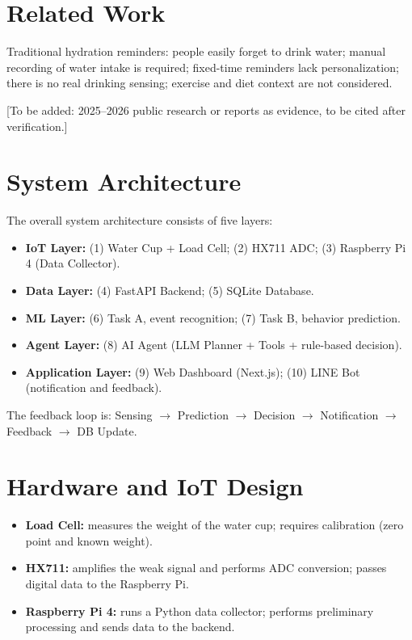 \documentclass[conference]{IEEEtran}
\begin{document}
\section{Related Work}

Traditional hydration reminders: people easily forget to drink water; manual recording of water intake is required; fixed-time reminders lack personalization; there is no real drinking sensing; exercise and diet context are not considered.

[To be added: 2025--2026 public research or reports as evidence, to be cited after verification.]

\section{System Architecture}

The overall system architecture consists of five layers:
\begin{itemize}
\item \textbf{IoT Layer:} (1) Water Cup + Load Cell; (2) HX711 ADC; (3) Raspberry Pi 4 (Data Collector).
\item \textbf{Data Layer:} (4) FastAPI Backend; (5) SQLite Database.
\item \textbf{ML Layer:} (6) Task A, event recognition; (7) Task B, behavior prediction.
\item \textbf{Agent Layer:} (8) AI Agent (LLM Planner + Tools + rule-based decision).
\item \textbf{Application Layer:} (9) Web Dashboard (Next.js); (10) LINE Bot (notification and feedback).
\end{itemize}
The feedback loop is: Sensing $\rightarrow$ Prediction $\rightarrow$ Decision $\rightarrow$ Notification $\rightarrow$ Feedback $\rightarrow$ DB Update.

\section{Hardware and IoT Design}

\begin{itemize}
\item \textbf{Load Cell:} measures the weight of the water cup; requires calibration (zero point and known weight).
\item \textbf{HX711:} amplifies the weak signal and performs ADC conversion; passes digital data to the Raspberry Pi.
\item \textbf{Raspberry Pi 4:} runs a Python data collector; performs preliminary processing and sends data to the backend.
\end{itemize}
\end{document}
